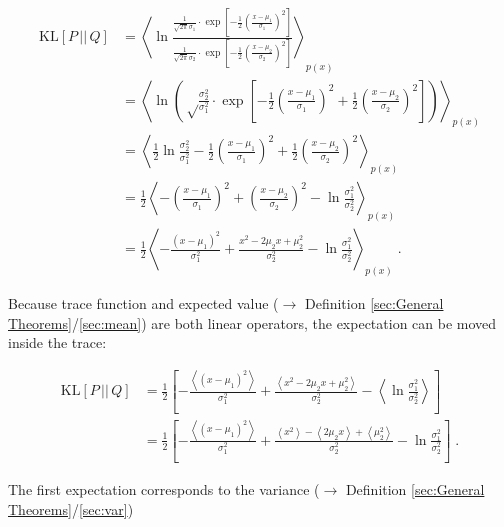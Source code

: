 \documentclass[a4paper,12pt,twoside]{book}
\begin{document}
\begin{equation} \label{eq:norm-kl-norm-KL-s2}
\begin{split}
\mathrm{KL}[P\,||\,Q] &= \left\langle \ln \frac{ \frac{1}{\sqrt{2 \pi} \sigma_1} \cdot \exp \left[ -\frac{1}{2} \left( \frac{x-\mu_1}{\sigma_1} \right)^2 \right] }{ \frac{1}{\sqrt{2 \pi} \sigma_2} \cdot \exp \left[ -\frac{1}{2} \left( \frac{x-\mu_2}{\sigma_2} \right)^2 \right] } \right\rangle_{p(x)} \\
&= \left\langle \ln \left( \sqrt \frac{\sigma_2^2}{\sigma_1^2} \cdot \exp\left[ -\frac{1}{2} \left( \frac{x-\mu_1}{\sigma_1} \right)^2 + \frac{1}{2} \left( \frac{x-\mu_2}{\sigma_2} \right)^2 \right] \right) \right\rangle_{p(x)} \\
&= \left\langle \frac{1}{2} \ln \frac{\sigma_2^2}{\sigma_1^2} -\frac{1}{2} \left( \frac{x-\mu_1}{\sigma_1} \right)^2 + \frac{1}{2} \left( \frac{x-\mu_2}{\sigma_2} \right)^2 \right\rangle_{p(x)} \\
&= \frac{1}{2} \left\langle - \left( \frac{x-\mu_1}{\sigma_1} \right)^2 + \left( \frac{x-\mu_2}{\sigma_2} \right)^2 - \ln \frac{\sigma_1^2}{\sigma_2^2} \right\rangle_{p(x)} \\
&= \frac{1}{2} \left\langle - \frac{(x-\mu_1)^2}{\sigma_1^2} + \frac{x^2 - 2 \mu_2 x + \mu_2^2}{\sigma_2^2} - \ln \frac{\sigma_1^2}{\sigma_2^2} \right\rangle_{p(x)} \; .
\end{split}
\end{equation}

Because trace function and expected value ($\rightarrow$ Definition \ref{sec:General Theorems}/\ref{sec:mean}) are both linear operators, the expectation can be moved inside the trace:

\begin{equation} \label{eq:norm-kl-norm-KL-s3}
\begin{split}
\mathrm{KL}[P\,||\,Q] &= \frac{1}{2} \left[ - \frac{\left\langle (x-\mu_1)^2 \right\rangle}{\sigma_1^2} + \frac{\left\langle x^2 - 2 \mu_2 x + \mu_2^2 \right\rangle}{\sigma_2^2} - \left\langle \ln \frac{\sigma_1^2}{\sigma_2^2} \right\rangle \right] \\
&= \frac{1}{2} \left[ - \frac{\left\langle (x-\mu_1)^2 \right\rangle}{\sigma_1^2} + \frac{\left\langle x^2 \right\rangle - \left\langle 2 \mu_2 x \right\rangle + \left\langle \mu_2^2 \right\rangle}{\sigma_2^2} - \ln \frac{\sigma_1^2}{\sigma_2^2} \right] \; .
\end{split}
\end{equation}

The first expectation corresponds to the variance ($\rightarrow$ Definition \ref{sec:General Theorems}/\ref{sec:var})
\end{document}
